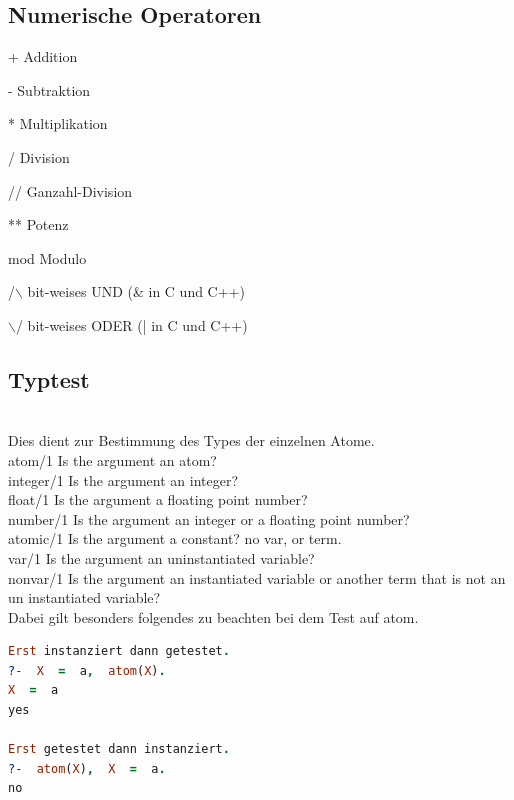\subsection{Numerische Operatoren}

+     Addition

-     Subtraktion

*     Multiplikation

/     Division    

//    Ganzahl-Division

**    Potenz

mod   Modulo

/$\backslash$    bit-weises UND   (\& in C und C++)

$\backslash$/    bit-weises ODER  (| in C und C++)


\subsection{Typtest}\qquad\\
Dies dient zur Bestimmung des Types der einzelnen Atome.\\
atom/1 	Is the argument an atom?\\
integer/1 	Is the argument an integer?\\
float/1 	Is the argument a floating point number?\\
number/1 	Is the argument an integer or a floating point number?\\
atomic/1 	Is the argument a constant? no var, or term. \\
var/1 	Is the argument an uninstantiated variable?\\
nonvar/1 	Is the argument an instantiated variable or another term that is not an un instantiated variable? \\
Dabei gilt besonders folgendes zu beachten bei dem Test auf atom. \\

\begin{lstlisting}[language=Prolog] 
Erst instanziert dann getestet. 
?-  X  =  a,  atom(X).
X  =  a
yes

Erst getestet dann instanziert. 
?-  atom(X),  X  =  a.
no 
\end{lstlisting}
